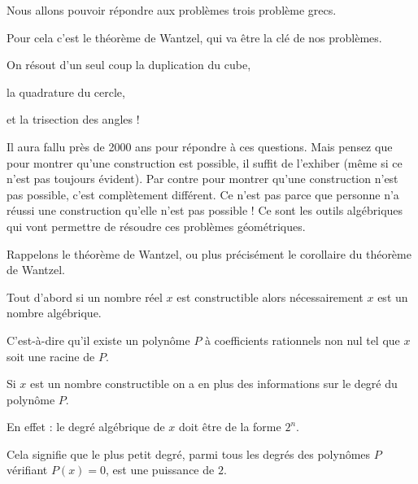 







\debuttexte


\diapo



\change

Nous allons pouvoir répondre aux problèmes trois problème grecs.

\change
Pour cela c'est le théorème de Wantzel, qui va être la clé de nos problèmes.


\change
On résout d'un seul coup la duplication du cube,

\change
la quadrature du cercle,

\change
et la trisection des angles !


Il aura fallu près de 2000 ans pour répondre à ces questions. 
Mais pensez que pour montrer qu'une construction
est possible, il suffit de l'exhiber (même si ce n'est pas toujours évident). 
Par contre pour montrer qu'une construction n'est pas possible, c'est complètement différent. 
Ce n'est pas parce que personne n'a réussi
une construction qu'elle n'est pas possible ! Ce sont 
les outils algébriques qui vont permettre de 
résoudre ces problèmes géométriques.



\diapo

Rappelons le théorème de Wantzel, ou plus précisément le corollaire du théorème de Wantzel.



Tout d'abord si un nombre réel $x$ est constructible alors nécessairement $x$ 
est un nombre algébrique.

\change
C'est-à-dire qu'il existe un polynôme $P$ à coefficients rationnels non nul tel que  $x$ soit une racine de $P$.

\change
Si $x$ est un nombre constructible on a en plus des informations sur le degré du polynôme $P$.

En effet : le degré algébrique de $x$ doit être de la forme $2^n$. 

\change
Cela signifie que le plus petit degré, parmi tous les degrés des polynômes
  $P$ vérifiant $P(x)=0$, est une puissance de $2$.
  

